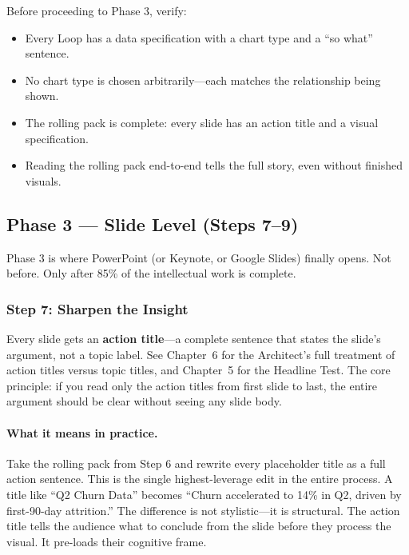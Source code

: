 \begin{keybox}
Before proceeding to Phase 3, verify:
\begin{itemize}[leftmargin=1.2em]
  \item Every Loop has a data specification with a chart type and a ``so what'' sentence.
  \item No chart type is chosen arbitrarily---each matches the relationship being shown.
  \item The rolling pack is complete: every slide has an action title and a visual specification.
  \item Reading the rolling pack end-to-end tells the full story, even without finished visuals.
\end{itemize}
\end{keybox}

\subsection{Phase 3 --- Slide Level (Steps 7--9)}

Phase 3 is where PowerPoint (or Keynote, or Google Slides) finally opens. Not before. Only after 85\% of the intellectual work is complete.

\subsubsection{Step 7: Sharpen the Insight}

Every slide gets an \textbf{action title}---a complete sentence that states the slide's argument, not a topic label. See Chapter~6 for the Architect's full treatment of action titles versus topic titles, and Chapter~5 for the Headline Test. The core principle: if you read only the action titles from first slide to last, the entire argument should be clear without seeing any slide body.

\paragraph{What it means in practice.} Take the rolling pack from Step 6 and rewrite every placeholder title as a full action sentence. This is the single highest-leverage edit in the entire process. A title like ``Q2 Churn Data'' becomes ``Churn accelerated to 14\% in Q2, driven by first-90-day attrition.'' The difference is not stylistic---it is structural. The action title tells the audience what to conclude from the slide before they process the visual. It pre-loads their cognitive frame.

